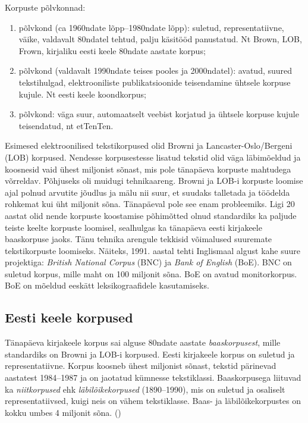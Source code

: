 \documentclass[12pt]{article}
\begin{document}
Korpuste põlvkonnad:
\begin{enumerate}
\item põlvkond (ca 1960ndate lõpp--1980ndate lõpp): suletud, representatiivne, väike, valdavalt 80ndatel
tehtud, palju käsitööd panustatud. Nt Brown, LOB, Frown, kirjaliku eesti keele 80ndate aastate korpus;
\item põlvkond (valdavalt 1990ndate teises pooles ja 2000ndatel): avatud, suured tekstihulgad,
elektrooniliste publikatsioonide teisendamine ühtsele korpuse kujule. Nt eesti keele koondkorpus;
\item põlvkond: väga suur, automaatselt veebist korjatud ja ühtsele korpuse kujule teisendatud, nt etTenTen.
\citep{KT}
\end{enumerate}

Esimesed elektroonilised tekstikorpused olid Browni ja Lancaster-Oslo/Bergeni (LOB) korpused. Nendesse korpusestesse lisatud tekstid olid väga läbimõeldud ja koosnesid vaid ühest miljonist sõnast, mis pole tänapäeva korpuste mahtudega võrreldav. Põhjuseks oli muidugi tehnikaareng. Browni ja LOB-i korpuste loomise ajal polnud arvutite jõudlus ja mälu nii suur, et suudaks talletada ja töödelda rohkemat kui üht miljonit sõna.
Tänapäeval pole see enam probleemiks. Ligi 20 aastat olid nende korpuste koostamise põhimõtted olnud standardiks ka paljude teiste keelte korpuste loomisel, sealhulgas ka tänapäeva eesti kirjakeele baaskorpuse jaoks. Tänu tehnika arengule tekkisid võimalused
suuremate tekstikorpuste loomiseks. Näiteks, 1991. aastal tehti Inglismaal algust kahe suure projektiga: \emph{British National Corpus} (BNC) ja \emph{Bank of English} (BoE). BNC on suletud korpus, mille maht on 100 miljonit sõna. BoE on avatud monitorkorpus. BoE on mõeldud eeskätt leksikograafidele kasutamiseks.
 \citep[9--11]{KR}


\subsection{Eesti keele korpused}

Tänapäeva kirjakeele korpus sai alguse 80ndate aastate \emph{baaskorpusest}, mille standardiks on Browni ja LOB-i korpused. Eesti kirjakeele korpus on suletud ja representatiivne. Korpus koosneb ühest miljonist sõnast, tekstid pärinevad aastatest 1984--1987 ja on jaotatud kümnesse tekstiklassi. Baaskorpusega liituvad ka \emph{niitkorpused} ehk \emph{läbilõikekorpused} (1890--1990), mis on suletud ja osaliselt representatiivsed, kuigi neis on vähem tekstiklasse. Baas- ja läbilõikekorpustes on kokku umbes 4 miljonit sõna. (\citealp[14--15]{KR})
\end{document}
